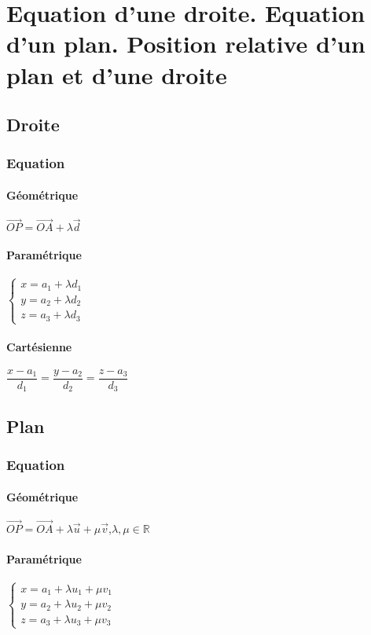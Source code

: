 \documentclass[12pt,a4paper]{report}
\begin{document}
	\chapter[Géométrie dans l'espace]{Equation d'une droite. Equation d'un plan. Position relative d'un plan et d'une droite}
	\section*{Droite}
	\vspace*{10cm}
	\subsection*{Equation}
	\subsubsection*{Géométrique}
	$\overrightarrow{OP}=\overrightarrow{OA}+\lambda \overrightarrow{d}$
	\subsubsection*{Paramétrique}
	$\left\{
	\begin{array}{l}
	x=a_1 + \lambda d_1 \\
	y=a_2 + \lambda d_2 \\
	z=a_3 + \lambda d_3
	\end{array}
	\right.$
	\subsubsection{Cartésienne}
	$\dfrac{x-a_1}{d_1}=\dfrac{y-a_2}{d_2}=\dfrac{z-a_3}{d_3}$
	\pagebreak
	\section*{Plan}
	\vspace{10cm}
	\subsection*{Equation}
	\subsubsection*{Géométrique}
	$\overrightarrow{OP}=\overrightarrow{OA} + \lambda \overrightarrow{u} + \mu \overrightarrow{v}$,$\lambda,\mu \in \mathbb{R}$
	\subsubsection*{Paramétrique}
	$\left\{
	\begin{array}{l}
	x=a_1 + \lambda u_1 + \mu v_1 \\
	y=a_2 + \lambda u_2 + \mu v_2 \\
	z=a_3 + \lambda u_3 + \mu v_3
	\end{array}
	\right.$
\end{document}
